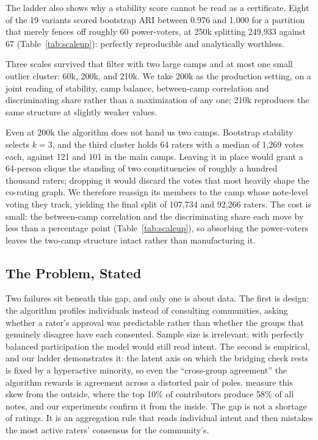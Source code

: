 \documentclass[10pt,twocolumn]{article}
\begin{document}
The ladder also shows why a stability score cannot be read as a certificate. Eight of the 19 variants scored bootstrap ARI between 0.976 and 1.000 for a partition that merely fences off roughly 60 power-voters, at 250k splitting 249{,}933 against 67 (Table~\ref{tab:scaleup}): perfectly reproducible and analytically worthless.

Three scales survived that filter with two large camps and at most one small outlier cluster: 60k, 200k, and 210k. We take 200k as the production setting, on a joint reading of stability, camp balance, between-camp correlation and discriminating share rather than a maximization of any one; 210k reproduces the same structure at slightly weaker values.

Even at 200k the algorithm does not hand us two camps. Bootstrap stability selects $k=3$, and the third cluster holds 64 raters with a median of 1{,}269 votes each, against 121 and 101 in the main camps. Leaving it in place would grant a 64-person clique the standing of two constituencies of roughly a hundred thousand raters; dropping it would discard the votes that most heavily shape the co-rating graph. We therefore reassign its members to the camp whose note-level voting they track, yielding the final split of 107{,}734 and 92{,}266 raters. The cost is small: the between-camp correlation and the discriminating share each move by less than a percentage point (Table~\ref{tab:scaleup}), so absorbing the power-voters leaves the two-camp structure intact rather than manufacturing it.

\subsection*{The Problem, Stated}
Two failures sit beneath this gap, and only one is about data. The first is design: the algorithm profiles individuals instead of consulting communities, asking whether a rater's approval was predictable rather than whether the groups that genuinely disagree have each consented. Sample size is irrelevant; with perfectly balanced participation the model would still read intent. The second is empirical, and our ladder demonstrates it: the latent axis on which the bridging check rests is fixed by a hyperactive minority, so even the ``cross-group agreement'' the algorithm rewards is agreement across a distorted pair of poles. \citet{razuvayevskaya2025timeliness} measure this skew from the outside, where the top 10\% of contributors produce 58\% of all notes, and our experiments confirm it from the inside. The gap is not a shortage of ratings. It is an aggregation rule that reads individual intent and then mistakes the most active raters' consensus for the community's.
\end{document}
